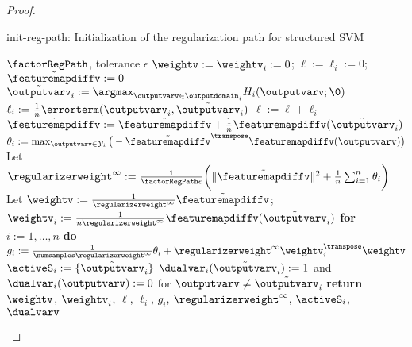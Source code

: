 \documentclass{article}
\begin{document}
\begin{proof}
\begin{algorithm}[t!]
    \caption{{\sc init-reg-path}: Initialization of the regularization path for structured SVM}
    \label{alg:rpInitSSVM}
    \begin{algorithmic}[1]
        \INPUT $\factorRegPath$, tolerance $\epsilon$ %
        \STATE  $\weightv := \weightv_i := 0$; \; $\ell := \ell_i := 0$; \; $\tilde{\featuremapdiffv} := 0$
        \STATE $\tilde{\outputvarv}_i := \argmax_{\outputvarv \in \outputdomain_i} H_i (\outputvarv; \0)$
        \STATE $\ell_i := \frac1n \errorterm(\outputvarv_i, \tilde{\outputvarv}_i)$
        \STATE $\ell := \ell + \ell_i$
        \STATE $\tilde{\featuremapdiffv} := \tilde{\featuremapdiffv} + \frac1n \featuremapdiffv(\tilde{\outputvarv}_i)$
        \ENDFOR
        \STATE $\theta_i := \max_{\outputvarv \in \mathcal{Y}_i}  \big( - \tilde{\featuremapdiffv}^{\transpose} \featuremapdiffv(\outputvarv) \big)$
        \ENDFOR
        \STATE Let $\regularizerweight^\infty := \frac{1}{\factorRegPath\epsilon}\bigg( \|\tilde{\featuremapdiffv}\|^2 + \frac1n \sum_{i=1}^n \theta_i \bigg)$
        \STATE Let $\weightv := \frac{1}{\regularizerweight^\infty} \tilde{\featuremapdiffv}$; \; $\weightv_i := \frac{1}{n \regularizerweight^\infty} \featuremapdiffv(\tilde{\outputvarv}_i)$
        \STATE \textbf{for} $i:=1,\dots,n$ \;\textbf{do}\; $g_i := \frac{1}{\numsamples \regularizerweight^\infty}\theta_i + \regularizerweight^\infty \weightv_i^{\transpose} \weightv$
          \label{alg:rpInitSSVM:activeSetBegin}
        \STATE $\activeS_i := \{\tilde{\outputvarv}_i\}$ 
        \STATE $\dualvar_i(\tilde{\outputvarv}_i):=1$ and $\dualvar_i(\outputvarv):=0$ for $\outputvarv \neq \tilde{\outputvarv}_i$
        \ENDFOR \label{alg:rpInitSSVM:activeSetEnd}
        \STATE \textbf{return} $\weightv$, $\weightv_i$, $\ell$, $\ell_i$, $g_i$, $\regularizerweight^\infty$, $\activeS_i$, $\dualvarv$
    \end{algorithmic}
\end{algorithm}


\end{proof}
\end{document}
